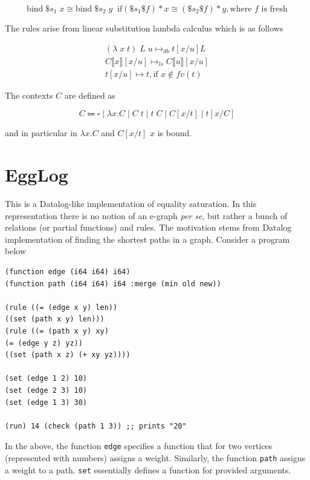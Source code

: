 \documentclass[acmsmall,screen, nonacm, anonymous]{acmart}
\begin{document}
\[
\text{bind}\;\$s_1\; x \cong \text{bind}\;\$s_2\;y \;\; \text{if} (\$s_1 \$f) * x \cong (\$s_2 \$f) * y, \text{where $f$ is fresh}
\]

\begin{remark}

The rules arise from linear substitution lambda calculus which is as follows

\begin{align*}
(\lambda\;x\;t)\;L\;u \mapsto_{db} t[x / u]L\\
C\llbracket x \rrbracket [x / u] \mapsto_{ls} C \llbracket u \rrbracket [x / u]\\
t[x/u] \mapsto t, \text{if } x \not \in fv(t)
\end{align*}

The contexts $C$ are defined as

\[
C \Coloneqq \square \;|\; \lambda x . C \; | \; C\;t \;|\; t\;C\;|\;C[x / t]\;|\;t[x / C]
\]

and in particular in $\lambda x . C$ and $C[x/t]$ $x$ is bound.

\end{remark}

\section{EggLog}

This is a Datalog-like implementation of equality saturation.
In this representation there is no notion of an e-graph \textit{per se}, but rather a bunch of relations (or partial functions) and rules.
The motivation stems from Datalog implementation of finding the shortest paths in a graph.
Consider a program below

\begin{verbatim}
(function edge (i64 i64) i64)
(function path (i64 i64) i64 :merge (min old new)) 

(rule ((= (edge x y) len)) 
((set (path x y) len))) 
(rule ((= (path x y) xy) 
(= (edge y z) yz))
((set (path x z) (+ xy yz))))

(set (edge 1 2) 10)
(set (edge 2 3) 10) 
(set (edge 1 3) 30)

(run) 14 (check (path 1 3)) ;; prints "20"  
\end{verbatim}

In the above, the function \texttt{edge} specifies a function that for two vertices (represented with numbers) assigns a weight.
Similarly, the function \texttt{path} assigns a weight to a path.
\texttt{set} essentially defines a function for provided arguments.
\end{document}
